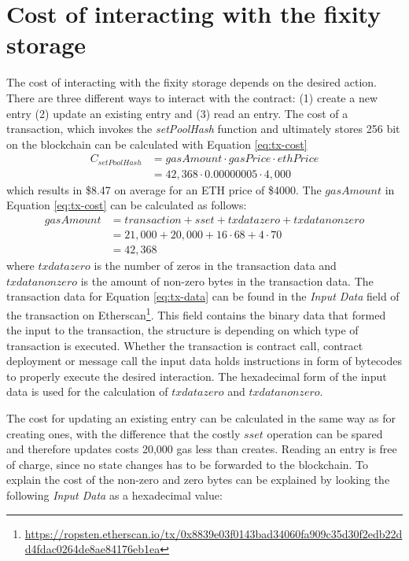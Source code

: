 \documentclass[final]{vutinfth}
\begin{document}
\section{Cost of interacting with the fixity storage}\label{sec:cost-interating}
The cost of interacting with the fixity storage depends on the desired action. There are three different ways to interact with the contract: (1) create a new entry (2) update an existing entry and (3) read an entry.
The cost of a transaction, which invokes the \textit{setPoolHash} function and ultimately stores 256 bit on the blockchain can be calculated with Equation \ref{eq:tx-cost}
\begin{equation}\label{eq:tx-cost}
    \begin{split}
        C_{setPoolHash} & = gasAmount \cdot gasPrice \cdot ethPrice \\ 
        & = 42,368 \cdot 0.00000005 \cdot 4,000
    \end{split}
\end{equation}
which results in \$8.47 on average for an ETH price of \$4000.
The $gasAmount$ in Equation \ref{eq:tx-cost} can be calculated as follows:
\begin{equation}\label{eq:tx-data}
  \begin{split}
    gasAmount & = transaction + sset + txdatazero + txdatanonzero \\
     & = 21,000 + 20,000 + 16 \cdot 68 + 4 \cdot 70  \\
     & = 42,368
  \end{split}
\end{equation}
where $txdatazero$ is the number of zeros in the transaction data and $txdatanonzero$ is the amount of non-zero bytes in the transaction data. The transaction data for Equation \ref{eq:tx-data} can be found in the \textit{Input Data} field of the transaction on Etherscan\footnote{\url{https://ropsten.etherscan.io/tx/0x8839e03f0143bad34060fa909c35d30f2edb22dd4fdac0264de8ae84176eb1ea}}. This field contains the binary data that formed the input to the transaction, the structure is depending on which type of transaction is executed. Whether the transaction is contract call, contract deployment or message call the input data holds instructions in form of bytecodes to properly execute the desired interaction. The hexadecimal form of the input data is used for the calculation of $txdatazero$ and $txdatanonzero$.

The cost for updating an existing entry can be calculated in the same way as for creating ones, with the difference that the costly $sset$ operation can be spared and therefore updates costs 20,000 gas less than creates.
Reading an entry is free of charge, since no state changes has to be forwarded to the blockchain.
To explain the cost of the non-zero and zero bytes can be explained by looking the following \textit{Input Data} as a hexadecimal value:
\end{document}
